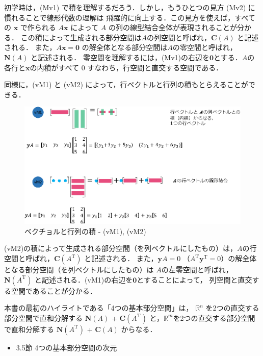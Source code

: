\documentclass[letterpaper]{article}
\DeclareRobustCommand\transp{^{\mathrm{T}}}
\begin{document}
初学時は，(Mv1) で積を理解するだろう．しかし，もうひとつの見方 (Mv2) に慣れることで線形代数の理解は
飛躍的に向上する．この見方を使えば，すべての $\bm{x}$ で作られる $A\bm{x}$ によって $A$ の列の線型結合全体が表現されることが分かる．
この積によって生成される部分空間は$A$の列空間と呼ばれ，$\mathbf{C}(A)$ と記述される．
また，$A\bm{x}=\bm{0}$ の解全体となる部分空間は$A$の零空間と呼ばれ，$\mathbf{N}(A)$ と記述される．
零空間を理解するには，(Mv1)の右辺を$\bm{0}$とする．$A$の各行と$\bm{x}$の内積がすべて $0$ すなわち，行空間と直交する空間である．

同様に，(vM1) と (vM2) によって，行ベクトルと行列の積もとらえることができる．

\begin{figure}[H]
  \includegraphics[keepaspectratio, width=\linewidth]{VectorTimesMatrix-j.eps}
  \caption{ベクチョルと行列の積 - (vM1), (vM2)}
\end{figure}

(vM2)の積によって生成される部分空間（を列ベクトルにしたもの）は，$A$の行空間と呼ばれ，$\mathbf{C}(A\transp)$ と記述される．
また，$\bm{y}A=0$ （$A\transp \bm{y}\transp=0$）の解全体となる部分空間（を列ベクトルにしたもの）は
$A$の左零空間と呼ばれ，$\mathbf{N}(A\transp)$ と記述される．(vM1)の右辺を$\bm{0}$とすることによって，
列空間と直交する空間であることが分かる．

本書の最初のハイライトである「4つの基本部分空間」は， $\mathbb{R}^n$ を2つの直交する部分空間で直和分解する
$\mathbf{N}(A)$ + $\mathbf{C}(A\transp)$ と，$\mathbb{R}^m$を2つの直交する部分空間で直和分解する
$\mathbf{N}(A\transp)$ + $\mathbf{C}(A)$ からなる．

\begin{itemize}
  \item 3.5節 4つの基本部分空間の次元
\end{itemize} 
\end{document}
